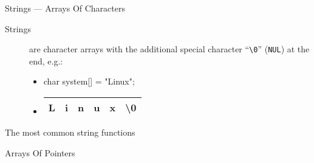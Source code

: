 \begin{frame}{Strings --- Arrays Of Characters}
  \begin{description}
  \item[Strings] are \alert{character arrays} with the additional special character
    ``\texttt{\textbackslash0}'' (\texttt{NUL}) at the end, e.g.:
    \ttfamily
    \begin{itemize}
    \item[] char system[] = "Linux";
    \item[] \begin{tabular}{*{6}{|c}|} \hline
              L&i&n&u&x&\textbackslash0\\\hline
            \end{tabular}
          \end{itemize}
  \end{description}
  \begin{iblock}{The most common string functions}
  \end{iblock}
\end{frame}

\begin{frame}{Arrays Of Pointers}
\end{frame}

